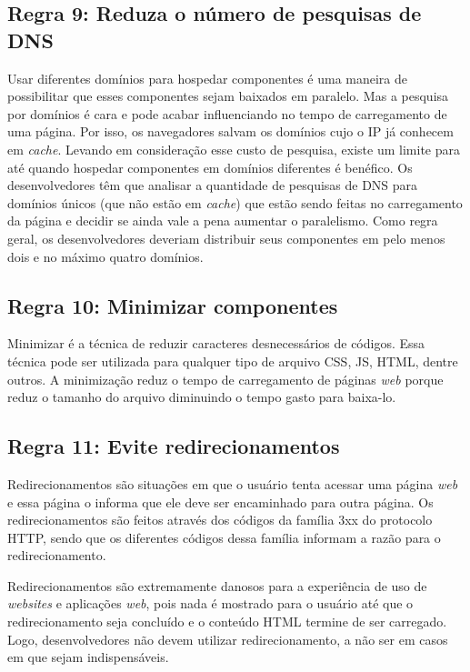 \subsection{Regra 9: Reduza o número de pesquisas de DNS}
\label{subsec:highperformance_regra9}
Usar diferentes domínios para hospedar componentes é uma maneira de possibilitar que esses componentes sejam baixados em paralelo. Mas a pesquisa por domínios é cara e pode acabar influenciando no tempo de carregamento de uma página. Por isso, os navegadores salvam os domínios cujo o IP já conhecem em \textit{cache}. Levando em consideração esse custo de pesquisa, existe um limite para até quando hospedar componentes em domínios diferentes é benéfico. Os desenvolvedores têm que analisar a quantidade de pesquisas de DNS para domínios únicos (que não estão em \textit{cache}) que estão sendo feitas no carregamento da página e decidir se ainda vale a pena aumentar o paralelismo. Como regra geral, os desenvolvedores deveriam distribuir seus componentes em pelo menos dois e no máximo quatro domínios.

\subsection{Regra 10: Minimizar componentes}
\label{subsec:highperformance_regra10}
Minimizar é a técnica de reduzir caracteres desnecessários de códigos. Essa técnica pode ser utilizada para qualquer tipo de arquivo CSS, JS, HTML, dentre outros. A minimização reduz o tempo de carregamento de páginas \textit{web} porque reduz o tamanho do arquivo diminuindo o tempo gasto para baixa-lo.

\subsection{Regra 11: Evite redirecionamentos}
\label{subsec:highperformance_regra11}
Redirecionamentos são situações em que o usuário tenta acessar uma página \textit{web} e essa página o informa que ele deve ser encaminhado para outra página. Os redirecionamentos são feitos através dos códigos da família 3xx do protocolo HTTP, sendo que os diferentes códigos dessa família informam a razão para o redirecionamento.

Redirecionamentos são extremamente danosos para a experiência de uso de \textit{websites} e aplicações \textit{web}, pois nada é mostrado para o usuário até que o redirecionamento seja concluído e o conteúdo HTML termine de ser carregado. Logo, desenvolvedores não devem utilizar redirecionamento, a não ser em casos em que sejam indispensáveis.

